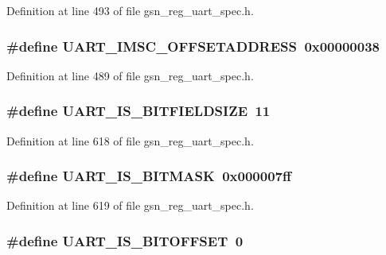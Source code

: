 Definition at line 493 of file gsn\_\-reg\_\-uart\_\-spec.h.

\hypertarget{a00575_a5a553c323e73adbb6112be8632b5066b}{
\subsubsection[{UART\_\-IMSC\_\-OFFSETADDRESS}]{\setlength{\rightskip}{0pt plus 5cm}\#define UART\_\-IMSC\_\-OFFSETADDRESS~0x00000038}}
\label{a00575_a5a553c323e73adbb6112be8632b5066b}


Definition at line 489 of file gsn\_\-reg\_\-uart\_\-spec.h.

\hypertarget{a00575_a9823ff9ee506397979914fc1750db5a1}{
\subsubsection[{UART\_\-IS\_\-BITFIELDSIZE}]{\setlength{\rightskip}{0pt plus 5cm}\#define UART\_\-IS\_\-BITFIELDSIZE~11}}
\label{a00575_a9823ff9ee506397979914fc1750db5a1}


Definition at line 618 of file gsn\_\-reg\_\-uart\_\-spec.h.

\hypertarget{a00575_a31e15880966e66c84cc8e629fc3e2e58}{
\subsubsection[{UART\_\-IS\_\-BITMASK}]{\setlength{\rightskip}{0pt plus 5cm}\#define UART\_\-IS\_\-BITMASK~0x000007ff}}
\label{a00575_a31e15880966e66c84cc8e629fc3e2e58}


Definition at line 619 of file gsn\_\-reg\_\-uart\_\-spec.h.

\hypertarget{a00575_a0b62695c05ab1bc7e415dbaaa5c9bfc8}{
\subsubsection[{UART\_\-IS\_\-BITOFFSET}]{\setlength{\rightskip}{0pt plus 5cm}\#define UART\_\-IS\_\-BITOFFSET~0}}
\label{a00575_a0b62695c05ab1bc7e415dbaaa5c9bfc8}


